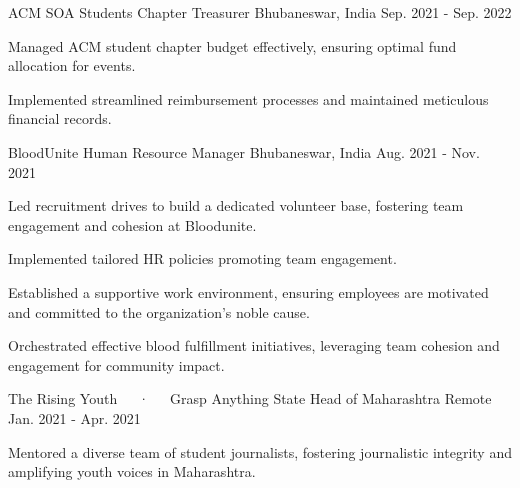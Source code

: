

\begin{cventries}

  \cventry    
    {ACM SOA Students Chapter} %
    {Treasurer} %
    {Bhubaneswar, India} %
    {Sep. 2021 - Sep. 2022} %
    {
      \begin{cvitems} %
        \item {Managed ACM student chapter budget effectively, ensuring optimal fund allocation for events.}
        \item {Implemented streamlined reimbursement processes and maintained meticulous financial records.}
      \end{cvitems}
    }

  \cventry
    {BloodUnite} %
    {Human Resource Manager} %
    {Bhubaneswar, India} %
    {Aug. 2021 - Nov. 2021} %
    {
      \begin{cvitems} %
        \item {Led recruitment drives to build a dedicated volunteer base, fostering team engagement and cohesion at Bloodunite.}
        \item {Implemented tailored HR policies promoting team engagement.}
        \item {Established a supportive work environment, ensuring employees are motivated and committed to the organization's noble cause.}
        \item {Orchestrated effective blood fulfillment initiatives, leveraging team cohesion and engagement for community impact.}
      \end{cvitems}
    }

  \cventry
    {The Rising Youth~~~·~~~Grasp Anything} %
    {State Head of Maharashtra} %
    {Remote} %
    {Jan. 2021 - Apr. 2021} %
    {
      \begin{cvitems} %
        \item {Mentored a diverse team of student journalists, fostering journalistic integrity and amplifying youth voices in Maharashtra.}
      \end{cvitems}
    }
    
\end{cventries}
